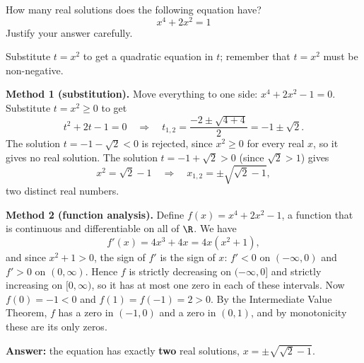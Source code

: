 
\begin{question}
How many real solutions does the following equation have?
\[ x^4 + 2x^2 = 1 \]
Justify your answer carefully.
\end{question}

\begin{hint}
Substitute $t = x^2$ to get a quadratic equation in $t$; remember that $t = x^2$ must be non-negative.
\end{hint}

\begin{solution}
\textbf{Method 1 (substitution).} Move everything to one side: $x^4 + 2x^2 - 1 = 0$. Substitute $t = x^2 \ge 0$ to get
\[ t^2 + 2t - 1 = 0 \quad\Longrightarrow\quad t_{1,2} = \frac{-2 \pm \sqrt{4 + 4}}{2} = -1 \pm \sqrt{2}. \]
The solution $t = -1 - \sqrt{2} < 0$ is rejected, since $x^2 \ge 0$ for every real $x$, so it gives no real solution.
The solution $t = -1 + \sqrt{2} > 0$ (since $\sqrt 2 > 1$) gives
\[ x^2 = \sqrt{2} - 1 \quad\Longrightarrow\quad x_{1,2} = \pm\sqrt{\sqrt{2} - 1}, \]
two distinct real numbers.

\textbf{Method 2 (function analysis).} Define $f(x) = x^4 + 2x^2 - 1$, a function that is continuous and differentiable on all of $\R$. We have
\[ f'(x) = 4x^3 + 4x = 4x(x^2 + 1), \]
and since $x^2 + 1 > 0$, the sign of $f'$ is the sign of $x$: $f' < 0$ on $(-\infty, 0)$ and $f' > 0$ on $(0, \infty)$.
Hence $f$ is strictly decreasing on $(-\infty, 0]$ and strictly increasing on $[0, \infty)$, so it has at most one zero in each of these intervals.
Now $f(0) = -1 < 0$ and $f(1) = f(-1) = 2 > 0$. By the Intermediate Value Theorem, $f$ has a zero in $(-1, 0)$ and a zero in $(0, 1)$, and by monotonicity these are its only zeros.

\textbf{Answer:} the equation has exactly \textbf{two} real solutions, $x = \pm\sqrt{\sqrt 2 - 1}$.
\end{solution}
